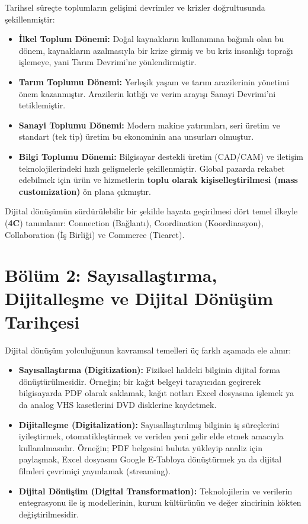 \documentclass[11pt,a4paper,openany]{book}
\begin{document}
Tarihsel süreçte toplumların gelişimi devrimler ve krizler doğrultusunda şekillenmiştir:
\begin{itemize}
    \item \textbf{İlkel Toplum Dönemi:} Doğal kaynakların kullanımına bağımlı olan bu dönem, kaynakların azalmasıyla bir krize girmiş ve bu kriz insanlığı toprağı işlemeye, yani Tarım Devrimi'ne yönlendirmiştir.
    \item \textbf{Tarım Toplumu Dönemi:} Yerleşik yaşam ve tarım arazilerinin yönetimi önem kazanmıştır. Arazilerin kıtlığı ve verim arayışı Sanayi Devrimi'ni tetiklemiştir.
    \item \textbf{Sanayi Toplumu Dönemi:} Modern makine yatırımları, seri üretim ve standart (tek tip) üretim bu ekonominin ana unsurları olmuştur.
    \item \textbf{Bilgi Toplumu Dönemi:} Bilgisayar destekli üretim (CAD/CAM) ve iletişim teknolojilerindeki hızlı gelişmelerle şekillenmiştir. Global pazarda rekabet edebilmek için ürün ve hizmetlerin \textbf{toplu olarak kişiselleştirilmesi (mass customization)} ön plana çıkmıştır.
\end{itemize}

Dijital dönüşümün sürdürülebilir bir şekilde hayata geçirilmesi dört temel ilkeyle (\textbf{4C}) tanımlanır: Connection (Bağlantı), Coordination (Koordinasyon), Collaboration (İş Birliği) ve Commerce (Ticaret).

\needspace{9cm}
\section{Bölüm 2: Sayısallaştırma, Dijitalleşme ve Dijital Dönüşüm Tarihçesi}
Dijital dönüşüm yolculuğunun kavramsal temelleri üç farklı aşamada ele alınır:
\begin{itemize}
    \item \textbf{Sayısallaştırma (Digitization):} Fiziksel haldeki bilginin dijital forma dönüştürülmesidir. Örneğin; bir kağıt belgeyi tarayıcıdan geçirerek bilgisayarda PDF olarak saklamak, kağıt notları Excel dosyasına işlemek ya da analog VHS kasetlerini DVD disklerine kaydetmek.
    \item \textbf{Dijitalleşme (Digitalization):} Sayısallaştırılmış bilginin iş süreçlerini iyileştirmek, otomatikleştirmek ve veriden yeni gelir elde etmek amacıyla kullanılmasıdır. Örneğin; PDF belgesini buluta yükleyip analiz için paylaşmak, Excel dosyasını Google E-Tabloya dönüştürmek ya da dijital filmleri çevrimiçi yayınlamak (streaming).
    \item \textbf{Dijital Dönüşüm (Digital Transformation):} Teknolojilerin ve verilerin entegrasyonu ile iş modellerinin, kurum kültürünün ve değer zincirinin kökten değiştirilmesidir.
\end{itemize}
\end{document}
